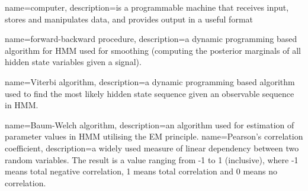 %
%
%
{
	name=computer,
	description={is a programmable machine that receives input,
		stores and manipulates data, and provides
		output in a useful format}
}

{
	name={forward-backward procedure},
	description={a dynamic programming based algorithm for HMM used for smoothing (computing the posterior marginals of all hidden state variables given a signal).}
}

{
	name={Viterbi algorithm},
	description={a dynamic programming based algorithm used to find the most likely hidden state sequence given an observable sequence in HMM.}
}
	
{
	name={Baum-Welch algorithm},
	description={an algorithm used for estimation of parameter values in HMM utilising the EM principle.}
}
{
	name={Pearson's correlation coefficient},
	description={a widely used measure of linear dependency between two random variables. The result is a value ranging from -1 to 1 (inclusive), where -1 means total negative correlation, 1 means total correlation and 0 means no correlation.}
}

%
%
%
%
%

%
%
%
